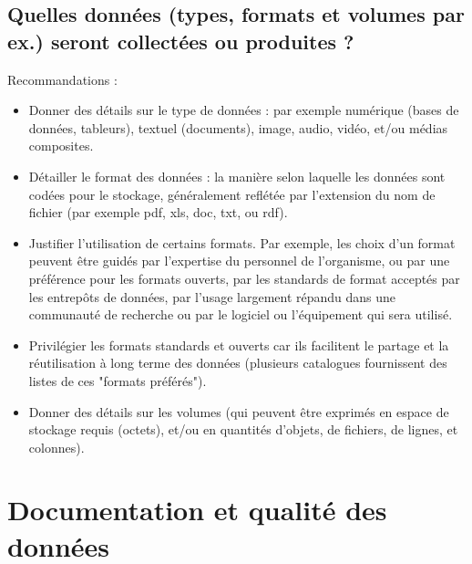 \documentclass{article}
\begin{document}
\subsection{Quelles données (types, formats et volumes par ex.) seront collectées ou produites ?}
Recommandations :
\begin{itemize}
    \item Donner des détails sur le type de données : par exemple numérique (bases de données, tableurs), textuel (documents), image, audio, vidéo, et/ou médias composites.
    \item Détailler le format des données : la manière selon laquelle les données sont codées pour le stockage, généralement reflétée par l'extension du nom de fichier (par exemple pdf, xls, doc, txt, ou rdf).
    \item Justifier l'utilisation de certains formats. Par exemple, les choix d’un format peuvent être guidés par l’expertise du personnel de l'organisme, ou par une préférence pour les formats ouverts, par les standards de format acceptés par les entrepôts de données, par l’usage largement répandu dans une communauté de recherche ou par le logiciel ou l'équipement qui sera utilisé.
    \item Privilégier les formats standards et ouverts car ils facilitent le partage et la réutilisation à long terme des données (plusieurs catalogues fournissent des listes de ces "formats préférés").
    \item Donner des détails sur les volumes (qui peuvent être exprimés en espace de stockage requis (octets), et/ou en quantités d'objets, de fichiers, de lignes, et colonnes).
\end{itemize}
  
\section{Documentation et qualité des données}
\end{document}
